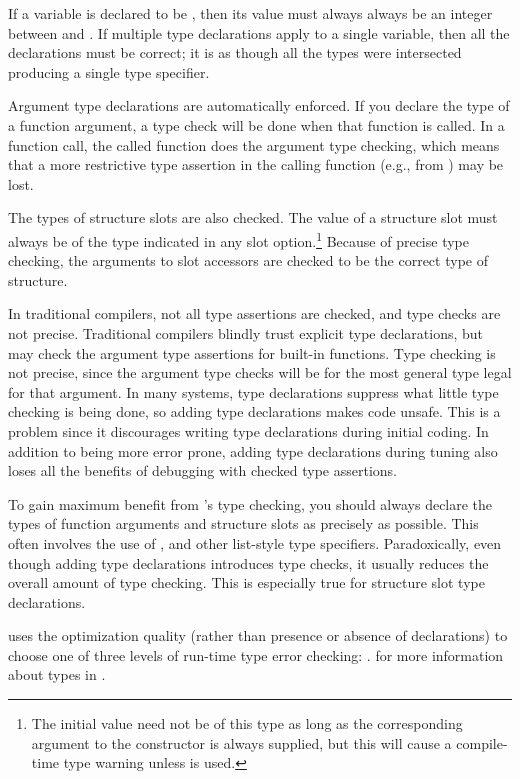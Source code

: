 {If a variable is declared to be , then its value must
always always be an integer between  and .  If multiple type
declarations apply to a single variable, then all the declarations must be
correct; it is as though all the types were intersected producing a single
 type specifier.

Argument type declarations are automatically enforced.  If you declare the type
of a function argument, a type check will be done when that function is called.
In a function call, the called function does the argument type checking, which
means that a more restrictive type assertion in the calling function (e.g.,
from ) may be lost.

The types of structure slots are also checked.  The value of a
structure slot must always be of the type indicated in any
 slot option.\footnote{The initial value need not be of
this type as long as the corresponding argument to the constructor is
always supplied, but this will cause a compile-time type warning
unless  is used.} Because of precise type
checking, the arguments to slot accessors are checked to be the
correct type of structure.

In traditional \llisp{} compilers, not all type assertions are checked, and type
checks are not precise.  Traditional compilers blindly trust explicit type
declarations, but may check the argument type assertions for built-in
functions.  Type checking is not precise, since the argument type checks will
be for the most general type legal for that argument.  In many systems, type
declarations suppress what little type checking is being done, so adding type
declarations makes code unsafe.  This is a problem since it discourages
writing type declarations during initial coding.  In addition to being more
error prone, adding type declarations during tuning also loses all the benefits
of debugging with checked type assertions.

To gain maximum benefit from \Python{}'s type checking, you should always declare
the types of function arguments and structure slots as precisely as possible.
This often involves the use of ,  and other list-style type
specifiers.  Paradoxically, even though adding type declarations introduces
type checks, it usually reduces the overall amount of type checking.  This is
especially true for structure slot type declarations.

\Python{} uses the  optimization quality (rather than presence or
absence of declarations) to choose one of three levels of run-time type error
checking: .   for more information about types in \Python.

}
